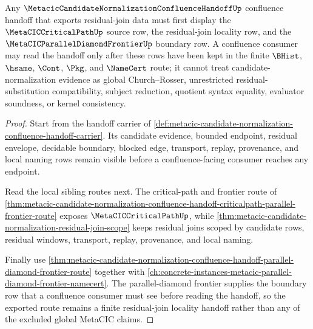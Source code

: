 \begin{theorem}
\label{thm:metacic-candidate-normalization-confluence-handoff-scope}
Any $\MetacicCandidateNormalizationConfluenceHandoffUp$ confluence handoff that exports residual-join data must first display the $\MetaCICCriticalPathUp$ source row, the residual-join locality row, and the $\MetaCICParallelDiamondFrontierUp$ boundary row. A confluence consumer may read the handoff only after these rows have been kept in the finite $\BHist$, $\hsame$, $\Cont$, $\Pkg$, and $\NameCert$ route; it cannot treat candidate-normalization evidence as global Church--Rosser, unrestricted residual-substitution compatibility, subject reduction, quotient syntax equality, evaluator soundness, or kernel consistency.
\end{theorem}
\begin{proof}
Start from the handoff carrier of \autoref{def:metacic-candidate-normalization-confluence-handoff-carrier}. Its candidate evidence, bounded endpoint, residual envelope, decidable boundary, blocked edge, transport, replay, provenance, and local naming rows remain visible before a confluence-facing consumer reaches any endpoint.

Read the local sibling routes next. The critical-path and frontier route of \autoref{thm:metacic-candidate-normalization-confluence-handoff-criticalpath-parallel-frontier-route} exposes $\MetaCICCriticalPathUp$, while \autoref{thm:metacic-candidate-normalization-residual-join-scope} keeps residual joins scoped by candidate rows, residual windows, transport, replay, provenance, and local naming.

Finally use \autoref{thm:metacic-candidate-normalization-confluence-handoff-parallel-diamond-frontier-route} together with \autoref{ch:concrete-instances-metacic-parallel-diamond-frontier-namecert}. The parallel-diamond frontier supplies the boundary row that a confluence consumer must see before reading the handoff, so the exported route remains a finite residual-join locality handoff rather than any of the excluded global MetaCIC claims.
\end{proof}
